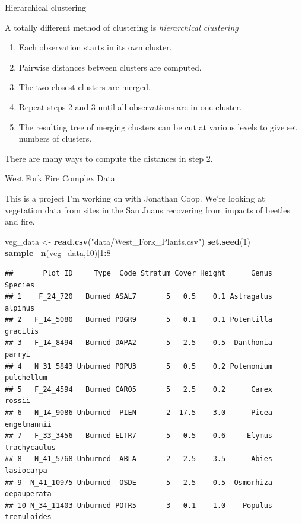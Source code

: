 \documentclass[
  ignorenonframetext,
]{beamer}
\newenvironment{Shaded}{\begin{snugshade}}{\end{snugshade}}
\newcommand{\DecValTok}[1]{\textcolor[rgb]{0.00,0.00,0.81}{#1}}
\newcommand{\KeywordTok}[1]{\textcolor[rgb]{0.13,0.29,0.53}{\textbf{#1}}}
\newcommand{\NormalTok}[1]{#1}
\newcommand{\OperatorTok}[1]{\textcolor[rgb]{0.81,0.36,0.00}{\textbf{#1}}}
\newcommand{\StringTok}[1]{\textcolor[rgb]{0.31,0.60,0.02}{#1}}
\providecommand{\tightlist}{%
  \setlength{\itemsep}{0pt}\setlength{\parskip}{0pt}}
\begin{document}
\begin{frame}{Hierarchical clustering}
\protect\hypertarget{hierarchical-clustering}{}

A totally different method of clustering is \emph{hierarchical
clustering}

\begin{enumerate}
\tightlist
\item
  Each observation starts in its own cluster.
\item
  Pairwise distances between clusters are computed.
\item
  The two closest clusters are merged.
\item
  Repeat steps 2 and 3 until all observations are in one cluster.
\item
  The resulting tree of merging clusters can be cut at various levels to
  give set numbers of clusters.
\end{enumerate}

There are many ways to compute the distances in step 2.

\end{frame}

\begin{frame}[fragile]{West Fork Fire Complex Data}
\protect\hypertarget{west-fork-fire-complex-data}{}

This is a project I'm working on with Jonathan Coop. We're looking at
vegetation data from sites in the San Juans recovering from impacts of
beetles and fire.

\scriptsize

\begin{Shaded}
\begin{Highlighting}[]
\NormalTok{veg_data <-}\StringTok{ }\KeywordTok{read.csv}\NormalTok{(}\StringTok{"data/West_Fork_Plants.csv"}\NormalTok{)}
\KeywordTok{set.seed}\NormalTok{(}\DecValTok{1}\NormalTok{)}
\KeywordTok{sample_n}\NormalTok{(veg_data,}\DecValTok{10}\NormalTok{)[}\DecValTok{1}\OperatorTok{:}\DecValTok{8}\NormalTok{]}
\end{Highlighting}
\end{Shaded}

\begin{verbatim}
##       Plot_ID     Type  Code Stratum Cover Height      Genus      Species
## 1    F_24_720   Burned ASAL7       5   0.5    0.1 Astragalus      alpinus
## 2   F_14_5080   Burned POGR9       5   0.1    0.1 Potentilla     gracilis
## 3   F_14_8494   Burned DAPA2       5   2.5    0.5  Danthonia       parryi
## 4   N_31_5843 Unburned POPU3       5   0.5    0.2 Polemonium   pulchellum
## 5   F_24_4594   Burned CARO5       5   2.5    0.2      Carex       rossii
## 6   N_14_9086 Unburned  PIEN       2  17.5    3.0      Picea  engelmannii
## 7   F_33_3456   Burned ELTR7       5   0.5    0.6     Elymus trachycaulus
## 8   N_41_5768 Unburned  ABLA       2   2.5    3.5      Abies   lasiocarpa
## 9  N_41_10975 Unburned  OSDE       5   2.5    0.5  Osmorhiza  depauperata
## 10 N_34_11403 Unburned POTR5       3   0.1    1.0    Populus  tremuloides
\end{verbatim}

\end{frame}
\end{document}
